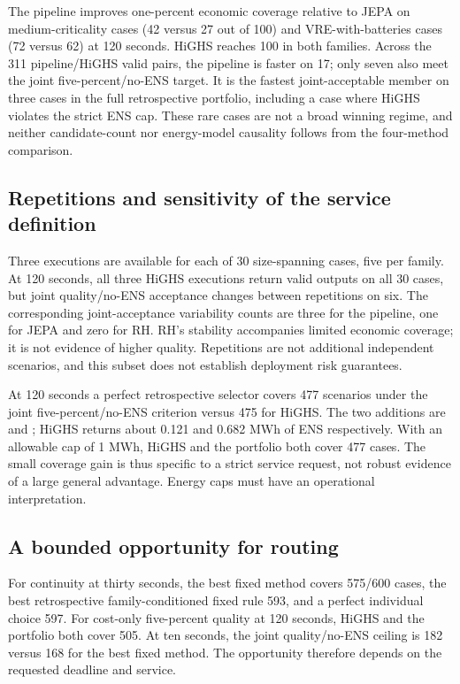 The pipeline improves one-percent economic coverage relative to JEPA on
medium-criticality cases (42 versus 27 out of 100) and VRE-with-batteries
cases (72 versus 62) at 120 seconds. HiGHS reaches 100 in both families.
Across the 311 pipeline/HiGHS valid pairs, the pipeline is faster on 17;
only seven also meet the joint five-percent/no-ENS target. It is the fastest
joint-acceptable member on three cases in the full retrospective portfolio,
including a case where HiGHS violates the strict ENS cap. These rare cases
are not a broad winning regime, and neither candidate-count nor energy-model
causality follows from the four-method comparison.

\subsection{Repetitions and sensitivity of the service definition}
Three executions are available for each of 30 size-spanning cases, five per
family. At 120 seconds, all three HiGHS executions return valid outputs on
all 30 cases, but joint quality/no-ENS acceptance changes between repetitions
on six. The corresponding joint-acceptance variability counts are three for
the pipeline, one for JEPA and zero for RH. RH's stability accompanies limited
economic coverage; it is not evidence of higher quality. Repetitions are not
additional independent scenarios, and this subset does not establish
deployment risk guarantees.

At 120 seconds a perfect retrospective selector covers 477 scenarios under
the joint five-percent/no-ENS criterion versus 475 for HiGHS. The two additions
are  and
; HiGHS returns about
0.121 and 0.682 MWh of ENS respectively. With an allowable cap of 1 MWh,
HiGHS and the portfolio both cover 477 cases. The small coverage gain is thus
specific to a strict service request, not robust evidence of a large general
advantage. Energy caps must have an operational interpretation.

\subsection{A bounded opportunity for routing}
For continuity at thirty seconds, the best fixed method covers 575/600 cases,
the best retrospective family-conditioned fixed rule 593, and a perfect
individual choice 597. For cost-only five-percent quality at 120 seconds,
HiGHS and the portfolio both cover 505. At ten seconds, the joint
quality/no-ENS ceiling is 182 versus 168 for the best fixed method.
The opportunity therefore depends on the requested deadline and service.


